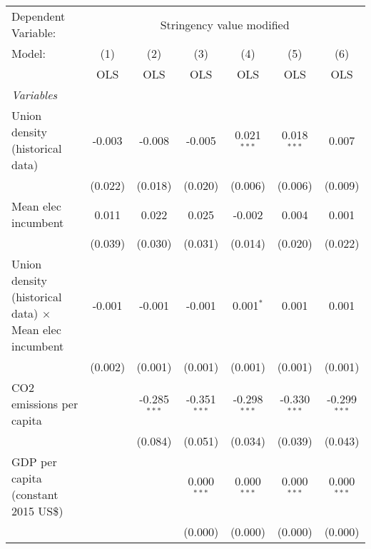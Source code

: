 
\begingroup
\centering
\begin{tabular}{lcccccc}
   \toprule
   Dependent Variable: & \multicolumn{6}{c}{Stringency value modified}\\
   Model:                                                        & (1)     & (2)            & (3)            & (4)            & (5)            & (6)\\  
                                                                 &  OLS    & OLS            & OLS            & OLS            & OLS            & OLS\\  
   \midrule
   \emph{Variables}\\
   Union density (historical data)                               & -0.003  & -0.008         & -0.005         & 0.021$^{***}$  & 0.018$^{***}$  & 0.007\\   
                                                                 & (0.022) & (0.018)        & (0.020)        & (0.006)        & (0.006)        & (0.009)\\   
   Mean elec incumbent                                           & 0.011   & 0.022          & 0.025          & -0.002         & 0.004          & 0.001\\   
                                                                 & (0.039) & (0.030)        & (0.031)        & (0.014)        & (0.020)        & (0.022)\\   
   Union density (historical data) $\times$ Mean elec incumbent  & -0.001  & -0.001         & -0.001         & 0.001$^{*}$    & 0.001          & 0.001\\   
                                                                 & (0.002) & (0.001)        & (0.001)        & (0.001)        & (0.001)        & (0.001)\\   
   CO2 emissions per capita                                      &         & -0.285$^{***}$ & -0.351$^{***}$ & -0.298$^{***}$ & -0.330$^{***}$ & -0.299$^{***}$\\   
                                                                 &         & (0.084)        & (0.051)        & (0.034)        & (0.039)        & (0.043)\\   
   GDP per capita (constant 2015 US\$)                           &         &                & 0.000$^{***}$  & 0.000$^{***}$  & 0.000$^{***}$  & 0.000$^{***}$\\   
                                                                 &         &                & (0.000)        & (0.000)        & (0.000)        & (0.000)\\   

\end{tabular}
